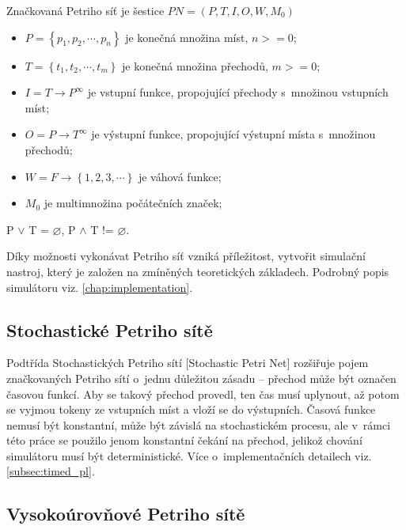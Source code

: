 Značkovaná Petriho síť je šestice $PN = \left(P, T, I, O, W, M_0\right)$
\begin{itemize}
  \item $P = \left\{p_1, p_2, \cdots , p_n\right\}$ je konečná množina míst, $n >= 0$; \\
  \item $T = \left\{t_1, t_2, \cdots , t_m\right\}$ je konečná množina přechodů, $m >= 0$; \\
  \item $I = T \rightarrow P^\infty$ je vstupní funkce, propojující přechody s~množinou vstupních míst; \\
  \item $O = P \rightarrow T^\infty$ je výstupní funkce, propojující výstupní místa s~množinou přechodů; \\
  \item $W = F \rightarrow \left\{1, 2, 3, \cdots \right\}$ je váhová funkce; \\
  \item $M_0$ je multimnožina počátečních značek;
\end{itemize}
P $\vee$ T = $\varnothing$, P $\wedge$ T != $\varnothing$.

Díky možnosti vykonávat Petriho síť vzniká příležitost, vytvořit simulační nastroj, který je založen na zmíněných teoretických základech. Podrobný popis simulátoru viz. \ref{chap:implementation}.

\subsection{Stochastické Petriho sítě}
\label{subsec:timed-pn}

Podtřída Stochastických Petriho sítí [Stochastic Petri Net] rozšiřuje pojem značkovaných Petriho sítí o~jednu důležitou zásadu -- přechod může být označen časovou funkcí. Aby se takový přechod provedl, ten čas musí uplynout, až potom se vyjmou tokeny ze vstupních míst a vloží se do výstupních. Časová funkce nemusí být konstantní, může být závislá na stochastickém procesu, ale v~rámci této práce se použilo jenom konstantní čekání na přechod, jelikož chování simulátoru musí být deterministické. Více o~implementačních detailech viz. \ref{subsec:timed_pl}.

\subsection{Vysokoúrovňové Petriho sítě}
\label{subsec:hlpn}

